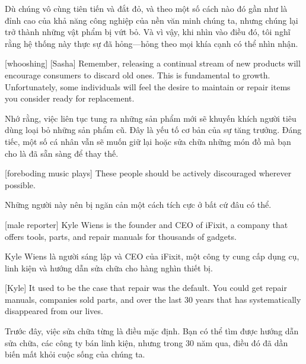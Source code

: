 \documentclass[a4paper]{article}
\begin{document}
	\begin{vietnamese-v2}
		Dù chúng vô cùng tiên tiến và đắt đỏ, và theo một số cách nào đó gần như là đỉnh cao của khả năng công nghiệp của nền văn minh chúng ta, nhưng chúng lại trở thành những vật phẩm bị vứt bỏ. Và vì vậy, khi nhìn vào điều đó, tôi nghĩ rằng hệ thống này thực sự đã hỏng—hỏng theo mọi khía cạnh có thể nhìn nhận.
	\end{vietnamese-v2}
	
	[whooshing]
	[Sasha] Remember, releasing a continual stream of new products will encourage consumers to discard old ones.
	This is fundamental to growth. Unfortunately, some individuals will feel the desire to maintain or repair items you consider ready for replacement.
	
	\begin{vietnamese-v2}
		 Nhớ rằng, việc liên tục tung ra những sản phẩm mới sẽ khuyến khích người tiêu dùng loại bỏ những sản phẩm cũ. Đây là yếu tố cơ bản của sự tăng trưởng. Đáng tiếc, một số cá nhân vẫn sẽ muốn giữ lại hoặc sửa chữa những món đồ mà bạn cho là đã sẵn sàng để thay thế.
	\end{vietnamese-v2}
	
	
	[foreboding music plays]
	These people should be actively discouraged wherever possible.
	
	\begin{vietnamese-v2}
		 Những người này nên bị ngăn cản một cách tích cực ở bất cứ đâu có thể.
	\end{vietnamese-v2}
	
	[male reporter] Kyle Wiens is the founder and CEO of iFixit, a company that offers tools, parts, and repair manuals for thousands of gadgets.
	
	\begin{vietnamese-v2}
		 Kyle Wiens là người sáng lập và CEO của iFixit, một công ty cung cấp dụng cụ, linh kiện và hướng dẫn sửa chữa cho hàng nghìn thiết bị.
	\end{vietnamese-v2}
	
	[Kyle] It used to be the case that repair was the default.
	You could get repair manuals, companies sold parts, and over the last 30 years that has systematically disappeared from our lives.
	
	\begin{vietnamese-v2}
		[Kyle] Trước đây, việc sửa chữa từng là điều mặc định. Bạn có thể tìm được hướng dẫn sửa chữa, các công ty bán linh kiện, nhưng trong 30 năm qua, điều đó đã dần biến mất khỏi cuộc sống của chúng ta.
	\end{vietnamese-v2}
	
\end{document}
